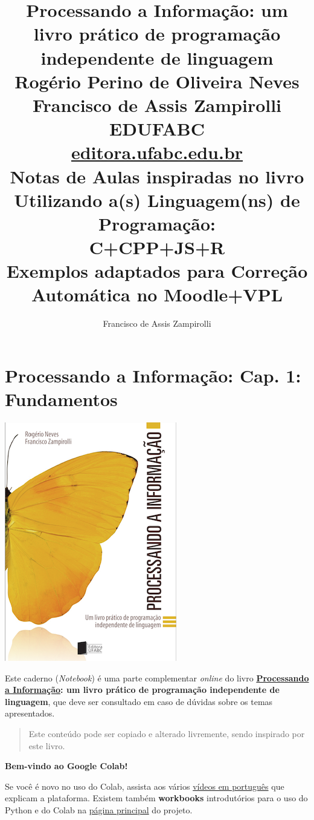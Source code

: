 \documentclass[12pt,a4paper]{article}
\title{Processando a Informação: um livro prático de programação independente de linguagem 
\\\large\vspace{2cm}
Rogério Perino de Oliveira Neves 
\\\vspace{5mm}
Francisco de Assis Zampirolli
\\\large\vspace{2cm}
EDUFABC
\\ \url{editora.ufabc.edu.br}
\\\Huge\vspace{3cm}
Notas de Aulas inspiradas no livro
\\\Large\vspace{1cm}
Utilizando a(s) Linguagem(ns) de Programação: 
\\\Huge\vspace{1cm}
C+CPP+JS+R
\\\large\vspace{1cm}
Exemplos adaptados para Correção Automática no Moodle+VPL
\vspace{2cm}}
\author{Francisco de Assis Zampirolli\vspace{1cm}}
\begin{document}
    
    
\clearpage\maketitle
\thispagestyle{empty}
\tableofcontents

    
    

    
    \hypertarget{processando-a-informauxe7uxe3o-cap.-1-fundamentos}{%
\section{Processando a Informação: Cap. 1:
Fundamentos}\label{processando-a-informauxe7uxe3o-cap.-1-fundamentos}}

    \includegraphics{"figs/Capa_Processando_Informacao.jpg"}

Este caderno (\emph{Notebook}) é uma parte complementar \emph{online} do
livro
\textbf{\href{https://editora.ufabc.edu.br/matematica-e-ciencias-da-computacao/58-processando-a-informacao}{Processando
a Informação}: um livro prático de programação independente de
linguagem}, que deve ser consultado em caso de dúvidas sobre os temas
apresentados.

\begin{quote}
Este conteúdo pode ser copiado e alterado livremente, sendo inspirado
por este livro.
\end{quote}

    \textbf{Bem-vindo ao Google Colab!}

Se você é novo no uso do Colab, assista aos vários
\href{https://www.youtube.com/results?search_query=introdu\%C3\%A7\%C3\%A3o+ao+colab}{vídeos
em português} que explicam a plataforma. Existem também
\textbf{workbooks} introdutórios para o uso do Python e do Colab na
\href{https://colab.research.google.com/}{página principal} do projeto.
\end{document}

